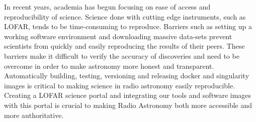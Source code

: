 In recent years, academia has begun focusing on ease of access and reproducibility of science. Science done with cutting edge instruments, such as LOFAR, tends to be time-consuming to reproduce. Barriers such as setting up a working software environment and downloading massive data-sets prevent scientists from quickly and easily reproducing the results of their peers. These barriers make it difficult to verify the accuracy of discoveries and need to be overcome in order to make astronomy more honest and transparent. Automatically building, testing, versioning and releasing docker and singularity images is critical to making science in radio astronomy easily reproducible. Creating a LOFAR science portal and integrating our tools and software images with this portal is crucial to making Radio Astronomy both more accessible and more authoritative.
